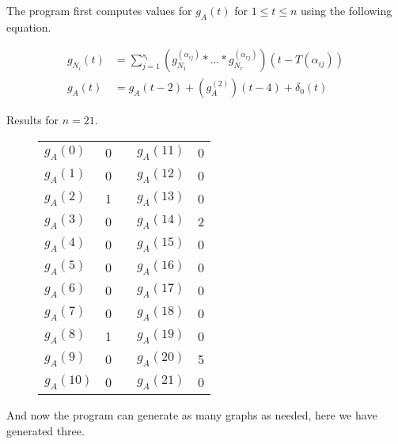 



The program first computes values for $g_A(t)$ for $1 \leq t \leq n$ using the following equation.

\begin{align*}
  g_{N_i}(t) &= \sum_{j=1}^{s_i} \left(g_{N_1}^{(\alpha_{ij})} * \hdots * g_{N_r}^{(\alpha_{rj})}\right)(t - T(\alpha_{ij})) \\
  g_A(t) &= g_A(t-2) + (g_A^{(2)})(t-4) + \delta_0(t)
\end{align*}

Results for $n=21$.

\begin{figure}[!h]
\centering
\begin{tabular}{l|l l l|l}
$g_A(0)$ & 0 & & $g_A(11)$ & 0 \\
$g_A(1)$ & 0 && $g_A(12)$ & 0 \\
$g_A(2)$ & 1 && $g_A(13)$ & 0 \\
$g_A(3)$ & 0 && $g_A(14)$ & 2 \\
$g_A(4)$ & 0 && $g_A(15)$ & 0 \\
$g_A(5)$ & 0 && $g_A(16)$ & 0 \\
$g_A(6)$ & 0 && $g_A(17)$ & 0 \\
$g_A(7)$ & 0 && $g_A(18)$ & 0 \\
$g_A(8)$ & 1 && $g_A(19)$ & 0 \\
$g_A(9)$ & 0 && $g_A(20)$ & 5 \\
$g_A(10)$ & 0 && $g_A(21)$ & 0 \\
\end{tabular}
\end{figure}

And now the program can generate as many graphs as needed, here we have generated three.


